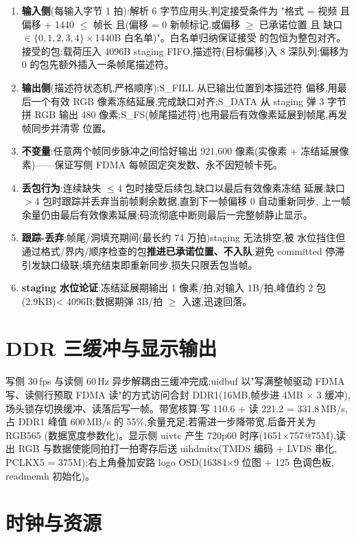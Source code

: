 \begin{enumerate}[nosep]
\item \textbf{输入侧}(每输入字节 1 拍):解析 6 字节应用头,判定接受条件为
"格式 = 视频 且 偏移 + 1440 $\leq$ 帧长 且(偏移 = 0 新帧标记,或偏移 $\geq$
已承诺位置 且 缺口 $\in\{0,1,2,3,4\}\times$1440B 白名单)"。白名单归纳保证接受
的包恒为整包对齐。接受的包:载荷压入 4096B staging FIFO,描述符(目标偏移)入
8 深队列;偏移为 0 的包先额外插入一条帧尾描述符。
\item \textbf{输出侧}(描述符状态机,严格顺序):S\_FILL 从已输出位置到本描述符
偏移,用最后一个有效 RGB 像素冻结延展,完成缺口对齐;S\_DATA 从 staging 弹 3 字节拼
RGB 输出 480 像素;S\_FS(帧尾描述符)也用最后有效像素延展到帧尾,再发帧同步并清零
位置。
\item \textbf{不变量}:任意两个帧同步脉冲之间恰好输出 921{,}600 像素(实像素 +
冻结延展像素)——保证写侧 FDMA 每帧固定突发数、永不因短帧卡死。
\item \textbf{丢包行为}:连续缺失 $\leq$4 包时接受后续包,缺口以最后有效像素冻结
延展;缺口 $>$4 包时跟踪并丢弃当前帧剩余数据,直到下一帧偏移 0 自动重新同步,
上一帧余量仍由最后有效像素延展;码流彻底中断则最后一完整帧静止显示。
\item \textbf{跟踪-丢弃}:帧尾/洞填充期间(最长约 74 万拍)staging 无法排空,被
水位挡住但通过格式/界内/顺序检查的包\textbf{推进已承诺位置、不入队},避免
committed 停滞引发缺口级联;填充结束即重新同步,损失只限丢包当帧。
\item \textbf{staging 水位论证}:冻结延展期输出 1 像素/拍,对输入 1B/拍,峰值约
2 包(2.9KB)< 4096B;数据期弹 3B/拍 $\geq$ 入速,迅速回落。
\end{enumerate}

\section{DDR 三缓冲与显示输出}

写侧 30\,fps 与读侧 60\,Hz 异步解耦由三缓冲完成:uidbuf 以"写满整帧驱动 FDMA
写、读侧行预取 FDMA 读"的方式访问合封 DDR1(16MB,帧步进 4MB $\times$ 3 缓冲),
场头锁存切换缓冲、读落后写一帧。带宽核算:写 110.6 + 读 221.2 = 331.8\,MB/s,
占 DDR1 峰值 600\,MB/s 的 55\%,余量充足;若需进一步降带宽,后备开关为 RGB565
(数据宽度参数化)。显示侧 uivtc 产生 720p60 时序(1651$\times$757@75M),读出
RGB 与数据使能同拍打一拍寄存后送 uihdmitx(TMDS 编码 + LVDS 串化,
PCLKX5 = 375M);右上角叠加安路 logo OSD(16384$\times$9 位图 + 125 色调色板,
readmemh 初始化)。

\section{时钟与资源}

